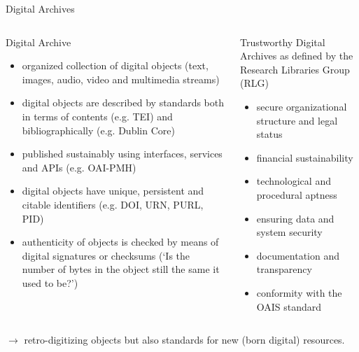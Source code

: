 \begin{frame}{Digital Archives}
\footnotesize
\begin{columns}
\begin{block}{Digital Archive}
\begin{itemize}
\item organized collection of digital objects (text, images, audio, video and multimedia streams)
\item digital objects are described by standards both in terms of contents (e.g. TEI) and bibliographically (e.g. Dublin Core)
\item published sustainably using interfaces, services and APIs (e.g. OAI-PMH)
\item digital objects have unique, persistent and citable identifiers (e.g. DOI, URN, PURL, PID)
\item authenticity of objects is checked by means of digital signatures or checksums (`Is the number of bytes in the object still the same it used to be?')
\end{itemize}
\end{block}
\begin{block}{Trustworthy Digital Archives}
as defined by the Research Libraries Group (RLG)
\begin{itemize}
\item secure organizational structure and legal status
\item financial sustainability
\item technological and procedural aptness
\item ensuring data and system security
\item documentation and transparency
\item conformity with the OAIS standard
\end{itemize}
\end{block}
\end{columns}
$\to$ retro-digitizing objects but also standards for new (born digital) resources.
\end{frame}


